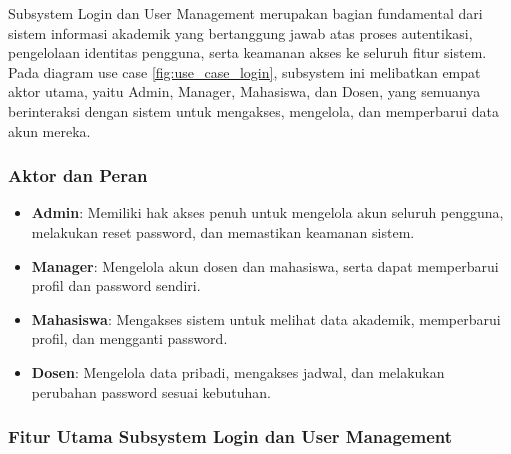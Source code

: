 \documentclass[a4paper,oneside,11pt]{book}
\begin{document}
Subsystem Login dan User Management merupakan bagian fundamental dari sistem informasi akademik yang bertanggung jawab atas proses autentikasi, pengelolaan identitas pengguna, serta keamanan akses ke seluruh fitur sistem. Pada diagram use case \ref{fig:use_case_login}, subsystem ini melibatkan empat aktor utama, yaitu Admin, Manager, Mahasiswa, dan Dosen, yang semuanya berinteraksi dengan sistem untuk mengakses, mengelola, dan memperbarui data akun mereka.

\subsubsection{Aktor dan Peran}

\begin{itemize}
  \item \textbf{Admin}: Memiliki hak akses penuh untuk mengelola akun seluruh pengguna, melakukan reset password, dan memastikan keamanan sistem.
  \item \textbf{Manager}: Mengelola akun dosen dan mahasiswa, serta dapat memperbarui profil dan password sendiri.
  \item \textbf{Mahasiswa}: Mengakses sistem untuk melihat data akademik, memperbarui profil, dan mengganti password.
  \item \textbf{Dosen}: Mengelola data pribadi, mengakses jadwal, dan melakukan perubahan password sesuai kebutuhan.
\end{itemize}

\subsubsection{Fitur Utama Subsystem Login dan User Management}
\end{document}
